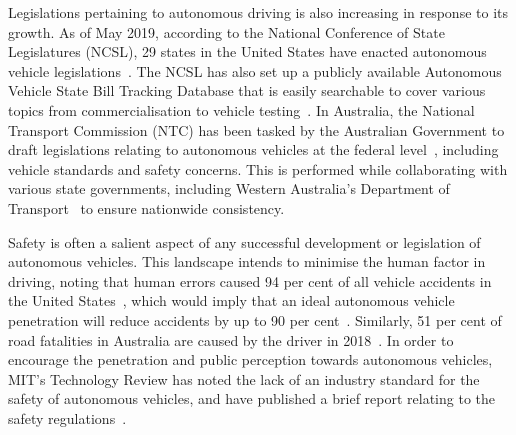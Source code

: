 Legislations pertaining to autonomous driving is also increasing in response to its growth. As of May 2019, according to the National Conference of State Legislatures (NCSL), 29 states in the United States have enacted autonomous vehicle legislations~\cite{hubbard_synthesis_2017}. The NCSL has also set up a publicly available Autonomous Vehicle State Bill Tracking Database that is easily searchable to cover various topics from commercialisation to vehicle testing~\cite{national_conference_of_state_legislatures_autonomous_2019}. In Australia, the National Transport Commission (NTC) has been tasked by the Australian Government to draft legislations relating to autonomous vehicles at the federal level~\cite{national_transport_commission_automated_2019}, including vehicle standards and safety concerns. This is performed while collaborating with various state governments, including Western Australia's Department of Transport~\cite{department_of_transport_automated_2018} to ensure nationwide consistency. %


Safety is often a salient aspect of any successful development or legislation of autonomous vehicles. This landscape intends to minimise the human factor in driving, noting that human errors caused 94 per cent of all vehicle accidents in the United States~\cite{singh_critical_2015}, which would imply that an ideal autonomous vehicle penetration will reduce accidents by up to 90 per cent~\cite{bertoncello_ten_2015}. Similarly, 51 per cent of road fatalities in Australia are caused by the driver in 2018~\cite{department_of_infrastructure_transport_cities_and_regional_development_safety_2019}. In order to encourage the penetration and public perception towards autonomous vehicles, MIT's Technology Review has noted the lack of an industry standard for the safety of autonomous vehicles, and have published a brief report relating to the safety regulations~\cite{mit_technology_review_insights_autonomous_2019}. 


